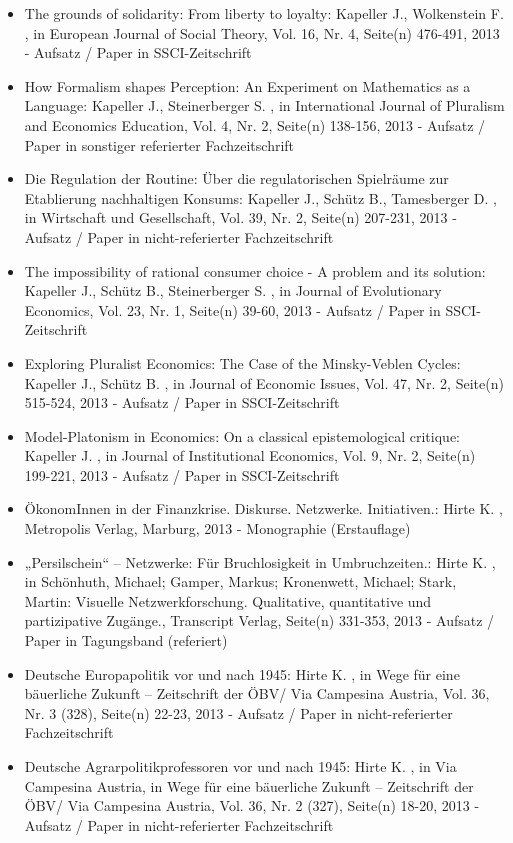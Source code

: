 \begin{itemize}
	 \item The grounds of solidarity: From liberty to loyalty: Kapeller J., Wolkenstein F. , in European Journal of Social Theory, Vol. 16, Nr. 4, Seite(n) 476-491, 2013 - Aufsatz / Paper in SSCI-Zeitschrift
	 \item How Formalism shapes Perception: An Experiment on Mathematics as a Language: Kapeller J., Steinerberger S. , in International Journal of Pluralism and Economics Education, Vol. 4, Nr. 2, Seite(n) 138-156, 2013 - Aufsatz / Paper in sonstiger referierter Fachzeitschrift
	 \item Die Regulation der Routine: Über die regulatorischen Spielräume zur Etablierung nachhaltigen Konsums: Kapeller J., Schütz B., Tamesberger D. , in Wirtschaft und Gesellschaft, Vol. 39, Nr. 2, Seite(n) 207-231, 2013 - Aufsatz / Paper in nicht-referierter Fachzeitschrift
	 \item The impossibility of rational consumer choice - A problem and its solution: Kapeller J., Schütz B., Steinerberger S. , in Journal of Evolutionary Economics, Vol. 23, Nr. 1, Seite(n) 39-60, 2013 - Aufsatz / Paper in SSCI-Zeitschrift
	 \item Exploring Pluralist Economics: The Case of the Minsky-Veblen Cycles: Kapeller J., Schütz B. , in Journal of Economic Issues, Vol. 47, Nr. 2, Seite(n) 515-524, 2013 - Aufsatz / Paper in SSCI-Zeitschrift
	 \item Model-Platonism in Economics: On a classical epistemological critique: Kapeller J. , in Journal of Institutional Economics, Vol. 9, Nr. 2, Seite(n) 199-221, 2013 - Aufsatz / Paper in SSCI-Zeitschrift
	 \item ÖkonomInnen in der Finanzkrise. Diskurse. Netzwerke. Initiativen.: Hirte K. , Metropolis Verlag, Marburg, 2013 - Monographie (Erstauflage)
	 \item „Persilschein“ – Netzwerke: Für Bruchlosigkeit in Umbruchzeiten.: Hirte K. , in Schönhuth, Michael; Gamper, Markus; Kronenwett, Michael; Stark, Martin: Visuelle Netzwerkforschung. Qualitative, quantitative und partizipative Zugänge., Transcript Verlag, Seite(n) 331-353, 2013 - Aufsatz / Paper in Tagungsband (referiert)
	 \item Deutsche Europapolitik vor und nach 1945: Hirte K. , in Wege für eine bäuerliche Zukunft – Zeitschrift der ÖBV/ Via Campesina Austria, Vol. 36, Nr. 3 (328), Seite(n) 22-23, 2013 - Aufsatz / Paper in nicht-referierter Fachzeitschrift
	 \item Deutsche Agrarpolitikprofessoren vor und nach 1945: Hirte K. , in Via Campesina Austria, in Wege für eine bäuerliche Zukunft – Zeitschrift der ÖBV/ Via Campesina Austria, Vol. 36, Nr. 2 (327), Seite(n) 18-20, 2013 - Aufsatz / Paper in nicht-referierter Fachzeitschrift

\end{itemize}
